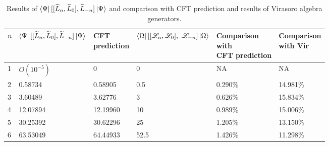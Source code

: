 \documentclass[12pt, nofootinbib]{article}
\theoremstyle{plain}
\theoremstyle{assumption}
\theoremstyle{definition}
\theoremstyle{plain}
\theoremstyle{plain}
\theoremstyle{plain}
\theoremstyle{plain}
\theoremstyle{plain}
\def\Leff{\widetilde{L}}
\def\Lcft{\mathscr{L}}
\begin{document}
\begin{table}[]
\begin{tabular}{|l|l|l|l|l|l|}
\hline
$n$ & {\small $\bra{\Psi}[[\Leff_n, \Leff_0],\Leff_{-n}]\ket{\Psi}$} & \makecell{\small CFT \\ prediction} & \makecell{\small $\bra{\Omega}[[\Lcft_n,\Lcft_0],$  \\ $ \Lcft_{-n}]\ket{\Omega}$} & \makecell{\small Comparison \\ \small with \\ \small CFT prediction} & \makecell{\small  Comparison \\ \small with  \small Vir} \\  \hline
1   & $O(10^{-5})$                                          & 0              & 0                                                         & NA                              & NA                                       \\ \hline
2   & 0.58734                                               & 0.58905        & 0.5                                                       & 0.290\%                         & 14.981\%                                 \\ \hline
3   & 3.60489                                               & 3.62776       & 3                                                         & 0.626\%                         & 15.834\%                                 \\ \hline
4   & 12.07894                                              & 12.19960       & 10                                                        & 0.989\%                         & 15.006\%                                 \\ \hline
5   & 30.25392                                              & 30.62296       & 25                                                        & 1.205\%                         & 13.150\%                                 \\ \hline
6   & 63.53049                                              & 64.44933       & 52.5                                                      & 1.426\%                         & 11.298\%                                 \\ \hline
\end{tabular}
\caption{Results of $\bra{\Psi}[[\Leff_n, \Leff_0],\Leff_{-n}]\ket{\Psi}$ and comparison with CFT prediction and results of Virasoro algebra generators.} 
\label{tab:Ln0n}
\end{table}
\end{document}
